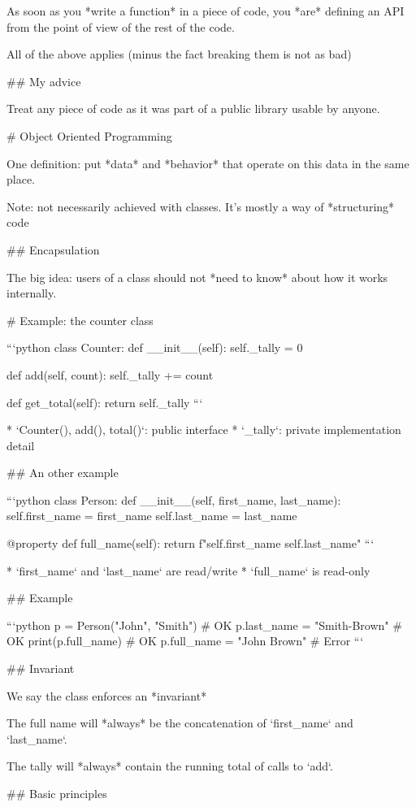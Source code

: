As soon as you *write a function* in a piece of code, you *are* defining
an API from the point of view of the rest of the code.

All of the above applies (minus the fact breaking them is not as bad)

## My advice

Treat any piece of code as it was part of a public library usable by anyone.

# Object Oriented Programming

One definition: put *data* and *behavior* that operate on this data in
the same place.

Note: not necessarily achieved with classes. It's mostly a way
of *structuring* code


## Encapsulation

The big idea: users of a class should not *need to know* about
how it works internally.

# Example: the counter class

```python
class Counter:
    def __init__(self):
        self._tally = 0

    def add(self, count):
        self._tally += count

    def get_total(self):
        return self._tally
```

* `Counter(), add(), total()`: public interface
* `_tally`: private implementation detail

## An other example

```python
class Person:
    def __init__(self, first_name, last_name):
        self.first_name = first_name
        self.last_name = last_name

    @property
    def full_name(self):
        return f"{self.first_name} {self.last_name}"
```

* `first_name` and `last_name` are read/write
* `full_name` is read-only

## Example

```python
p = Person("John", "Smith")  # OK
p.last_name = "Smith-Brown"  # OK
print(p.full_name)           # OK
p.full_name = "John Brown"   # Error
```

## Invariant

We say the class enforces an *invariant*

The full name will *always* be the concatenation of `first_name`
and `last_name`.

The tally will *always* contain the running total of calls to `add`.

## Basic principles

